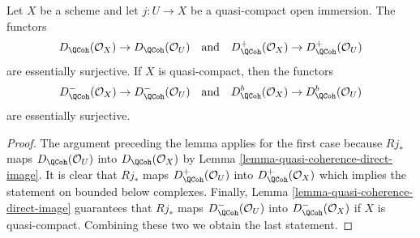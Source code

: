 \begin{lemma}
\label{lemma-lift-quasi-coherent}
Let $X$ be a scheme and let $j : U \to X$ be a quasi-compact
open immersion. The functors
$$
D_\QCoh(\mathcal{O}_X) \to D_\QCoh(\mathcal{O}_U)
\quad\text{and}\quad
D^+_\QCoh(\mathcal{O}_X) \to D^+_\QCoh(\mathcal{O}_U)
$$
are essentially surjective. If $X$ is quasi-compact, then the functors
$$
D^-_\QCoh(\mathcal{O}_X) \to D^-_\QCoh(\mathcal{O}_U)
\quad\text{and}\quad
D^b_\QCoh(\mathcal{O}_X) \to D^b_\QCoh(\mathcal{O}_U)
$$
are essentially surjective.
\end{lemma}

\begin{proof}
The argument preceding the lemma applies for the first case because $Rj_*$
maps $D_\QCoh(\mathcal{O}_U)$ into $D_\QCoh(\mathcal{O}_X)$
by Lemma \ref{lemma-quasi-coherence-direct-image}.
It is clear that $Rj_*$ maps
$D^+_\QCoh(\mathcal{O}_U)$ into
$D^+_\QCoh(\mathcal{O}_X)$
which implies the statement on bounded below complexes.
Finally, Lemma \ref{lemma-quasi-coherence-direct-image}
guarantees that $Rj_*$ maps
$D^-_\QCoh(\mathcal{O}_U)$ into
$D^-_\QCoh(\mathcal{O}_X)$
if $X$ is quasi-compact. Combining these two we obtain the last statement.
\end{proof}
